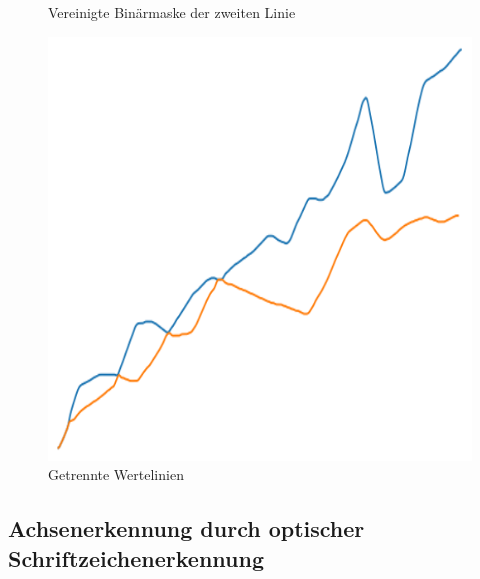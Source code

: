 \begin{figure}[h!]
\begin{minipage}{0.315\textwidth}
        \caption{ Vereinigte Binärmaske der zweiten Linie}
        \label{fig:alg_layer2_processed}
    \end{minipage}\hfill %
    \begin{minipage}{0.315\textwidth} %
        \centering
        \includegraphics[width=\linewidth]{Implementation/img/alg_mat.png}
        \caption{ Getrennte Wertelinien}
        \label{fig:alg_mat}
    \end{minipage}
\end{figure}

\subsection{Achsenerkennung durch optischer Schriftzeichenerkennung}

